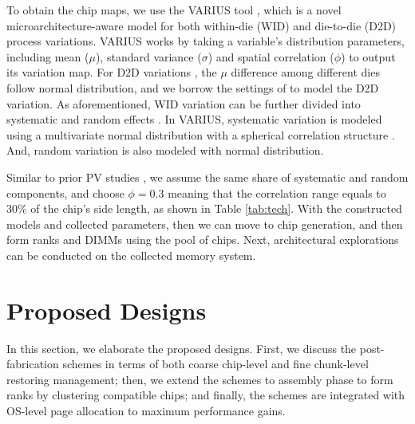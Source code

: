 To obtain the chip maps, we use the VARIUS tool \cite{SM08:varius}, which is a novel microarchitecture-aware model for both within-die (WID) and die-to-die (D2D) process variations. 
VARIUS works by taking a variable's distribution parameters, including mean ($\mu$), standard variance ($\sigma$) and spatial correlation ($\phi$) to output its variation map.
For D2D variations
, the $\mu$ difference among different dies follow normal distribution, and we borrow the settings of \cite{TC13:pv,SSC02:pv,MICRO07:pv} to model the D2D variation.
As aforementioned, WID variation can be further divided into systematic and random effects \cite{ISCA08:variation,HPCA14:mosaic}.
In VARIUS, systematic variation is modeled using a multivariate normal distribution with a spherical correlation structure \cite{SM08:varius}. 
And, random variation is also modeled with normal distribution. %

Similar to prior PV studies \cite{ICICDT:weight,HPCA14:mosaic}, we assume the same share of systematic and random components, and choose $\phi=0.3$ meaning that the correlation range equals to 30\% of the chip's side length, as shown in Table \ref{tab:tech}. 
With the constructed models and collected parameters, then we can move to chip generation, and then form ranks and DIMMs using the pool of chips. Next, architectural explorations can be conducted on the collected memory system. 

\section{Proposed Designs}
In this section, we elaborate the proposed designs. First, we discuss the post-fabrication schemes in terms of both coarse chip-level and fine chunk-level restoring management; then, we extend the schemes to assembly phase to form ranks by clustering compatible chips; and finally, the schemes are integrated with OS-level page allocation to maximum performance gains.

